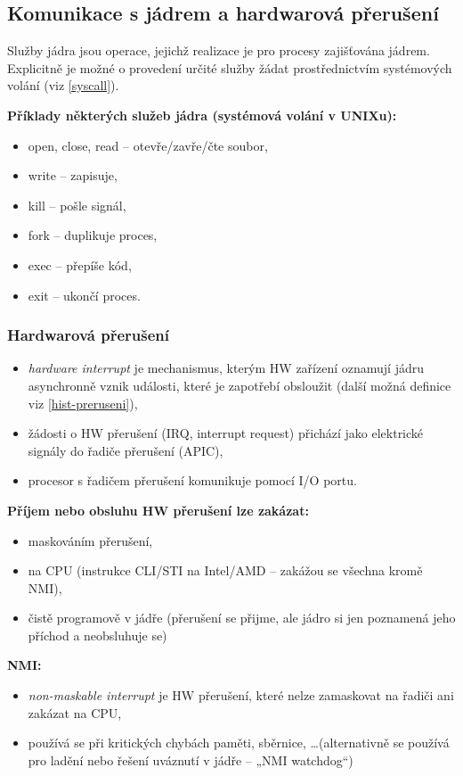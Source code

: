 \documentclass[a4paper, 11pt]{article}
\begin{document}
\newpage

\subsection{Komunikace s jádrem a hardwarová přerušení} \label{hw-preruseni}
Služby jádra jsou operace, jejichž realizace je pro procesy zajišťována jádrem. Explicitně je možné o provedení určité služby žádat prostřednictvím systémových volání (viz \ref{syscall}).

\textbf{Příklady některých služeb jádra (systémová volání v UNIXu):}
\begin{itemize}
    \item open, close, read -- otevře/zavře/čte soubor,
    \item write -- zapisuje,
    \item kill -- pošle signál,
    \item fork -- duplikuje proces,
    \item exec -- přepíše kód,
    \item exit -- ukončí proces.
\end{itemize}

\subsubsection{Hardwarová přerušení}
\begin{itemize}
    \item \emph{hardware interrupt} je mechanismus, kterým HW zařízení oznamují jádru asynchronně vznik události, které je zapotřebí obsloužit (další možná definice viz \ref{hist-preruseni}),
    \item žádosti o HW přerušení (IRQ, interrupt request) přichází jako elektrické signály do řadiče přerušení (APIC),
    \item procesor s řadičem přerušení komunikuje pomocí I/O portu.
\end{itemize}
 
\textbf{Příjem nebo obsluhu HW přerušení lze zakázat:}
\begin{itemize}
    \item maskováním přerušení, 
    \item na CPU (instrukce CLI/STI na Intel/AMD -- zakážou se všechna kromě NMI),
    \item čistě programově v jádře (přerušení se přijme, ale jádro si jen poznamená jeho příchod a neobsluhuje se)
\end{itemize}
 
\textbf{NMI:}
\begin{itemize}
    \item \emph{non-maskable interrupt} je HW přerušení, které nelze zamaskovat na řadiči ani zakázat na CPU,
    \item používá se při kritických chybách paměti, sběrnice, \ldots (alternativně se používá pro ladění nebo řešení uváznutí v jádře -- „NMI watchdog“)
\end{itemize}
 
\end{document}
